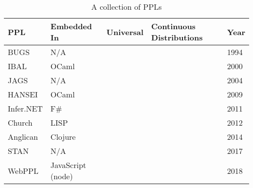 \begin{table}
	\centering
	\begin{tabular}{l|l|l|p{3cm}|l}
		\textbf{PPL}                       & \textbf{Embedded In} & \textbf{Universal} & \textbf{Continuous Distributions} & \textbf{Year} \\ \hline
		BUGS \cite{gilks1994bugs}          & N/A                  & \xmark             & \cmark                            & 1994          \\
		IBAL \cite{ibal}                   & OCaml                & \xmark             & \xmark                            & 2000          \\
		JAGS \cite{plummer2004jags}        & N/A                  & \xmark             & \cmark                            & 2004          \\
		HANSEI \cite{kiselyov2009embedded} & OCaml                & \xmark             & \xmark                            & 2009          \\
		Infer.NET \cite{wang2011using}     & F\#                  & \xmark             & \cmark                            & 2011          \\
		Church \cite{goodman2012church}    & LISP                 & \cmark             & \cmark                            & 2012          \\
		Anglican \cite{anglican-smc}       & Clojure              & \cmark             & \cmark                            & 2014          \\
		STAN \cite{carpenter2017stan}      & N/A                  & \xmark             & \cmark                            & 2017          \\
		WebPPL \cite{mobus2018structure}   & JavaScript (node)    & \cmark             & \cmark                            & 2018          \\
	\end{tabular}
	\caption{A collection of PPLs}
	\label{tab:ppl-summ}
\end{table}


